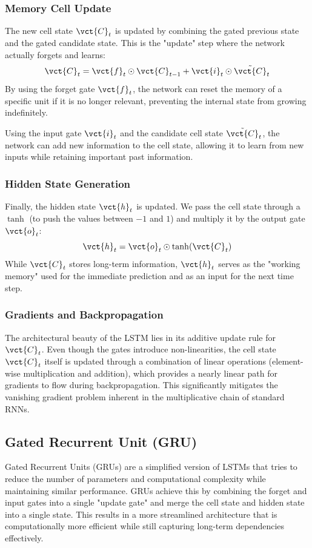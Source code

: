 \subsubsection{Memory Cell Update}
The new cell state $\vct{C}_t$ is updated by combining the gated previous state and the gated candidate state.
This is the "update" step where the network actually forgets and learns:
\begin{equation}
    \vct{C}_t = \vct{f}_t \odot \vct{C}_{t-1} + \vct{i}_t \odot \tilde{\vct{C}}_t
\end{equation}
By using the forget gate $\vct{f}_t$, the network can reset the memory of a specific unit if it is no longer relevant, preventing the internal state from growing indefinitely.

Using the input gate $\vct{i}_t$ and the candidate cell state $\tilde{\vct{C}}_t$, the network can add new information to the cell state, allowing it to learn from new inputs while retaining important past information.

\subsubsection{Hidden State Generation}
Finally, the hidden state $\vct{h}_t$ is updated.
We pass the cell state through a $\tanh$ (to push the values between $-1$ and $1$) and multiply it by the output gate $\vct{o}_t$:
\begin{equation}
    \vct{h}_t = \vct{o}_t \odot \tanh(\vct{C}_t)
\end{equation}
While $\vct{C}_t$ stores long-term information, $\vct{h}_t$ serves as the "working memory" used for the immediate prediction and as an input for the next time step.

\subsubsection{Gradients and Backpropagation}
The architectural beauty of the LSTM lies in its additive update rule for $\vct{C}_t$.
Even though the gates introduce non-linearities, the cell state $\vct{C}_t$ itself is updated through a combination of linear operations (element-wise multiplication and addition),
which provides a nearly linear path for gradients to flow during backpropagation.
This significantly mitigates the vanishing gradient problem inherent in the multiplicative chain of standard RNNs.

\subsection{Gated Recurrent Unit (GRU)}
Gated Recurrent Units (GRUs) are a simplified version of LSTMs that tries to reduce the number of parameters and computational complexity while maintaining similar performance.
GRUs achieve this by combining the forget and input gates into a single "update gate" and merge the cell state and hidden state into a single state.
This results in a more streamlined architecture that is computationally more efficient while still capturing long-term dependencies effectively.

